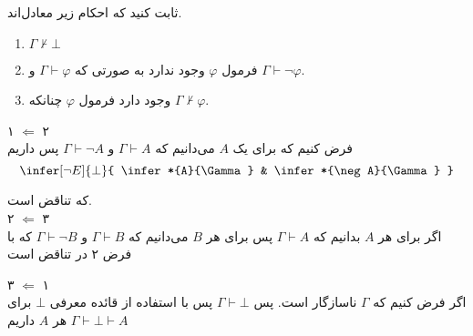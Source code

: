 
	
	ثابت کنید که احکام زیر معادل‌اند.
	\begin{enumerate}
		\item $\Gamma\nvdash \bot$	
		\item فرمول
		$\varphi$
		وجود ندارد به صورتی که 
		$\Gamma \vdash \varphi$ 
		و
		$\Gamma \vdash \neg \varphi$.
		
		\item وجود دارد فرمول
		$\varphi$
		چنانکه $\Gamma \nvdash \varphi$.
		
	\end{enumerate}
	
	\quad\vspace {-0.5 cm}
	\begin{ans}
		۱ $\Leftarrow$ ۲ \\
		فرض کنیم که برای یک $A$ می‌دانیم که
		$\Gamma \vdash A$
		و 
		$\Gamma \vdash \neg A$
		پس داریم
		$$
		\infer[\neg E]{\bot}{
			\infer*{A}{\Gamma}
			&
			\infer*{\neg A}{\Gamma}
		}	
		$$ 
		
		که تناقض است.\\
		۲ $\Leftarrow$ ۳ \\
		اگر برای هر 
		$A$
		بدانیم که
		$\Gamma \vdash A$
		پس برای هر 
		$B$
		می‌دانیم که 
		$\Gamma \vdash B$ و
		$\Gamma \vdash \neg B$
		که با فرض ۲ در تناقض است
		
		۳ $\Leftarrow$ ۱ \\
		اگر فرض کنیم که 
		$\Gamma$ 
		ناسازگار است.
		پس
		$\Gamma \vdash \bot$
		پس با استفاده از قائده معرفی 
		$\bot$
		برای هر
		$A$
		داریم
		$\Gamma \vdash \bot \vdash A$
		
	\end{ans}
